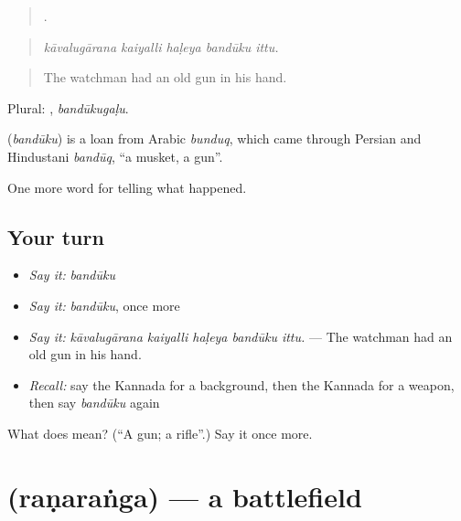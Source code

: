 \begin{quote}
    .
\end{quote}

\begin{quote}
\emph{kāvalugārana kaiyalli haḷeya bandūku ittu.}
\end{quote}

\begin{quote}
The watchman had an old gun in his hand.
\end{quote}

Plural: , \emph{bandūkugaḷu}.

\begin{cousinweb}
\textbf{} (\emph{bandūku}) is a loan from Arabic \emph{bunduq}, which came through Persian and Hindustani \emph{bandūq}, \textquotedblleft{}a musket, a gun\textquotedblright{}.
\end{cousinweb}

\begin{grammarlens}[title={What you've built}]
One more word for telling what happened.
\end{grammarlens}

\subsection*{Your turn}
\begin{itemize}
\raggedright
  \item \emph{Say it:} \emph{bandūku}
  \item \emph{Say it:} \emph{bandūku}, once more
  \item \emph{Say it:} \emph{kāvalugārana kaiyalli haḷeya bandūku ittu.} — The watchman had an old gun in his hand.
  \item \emph{Recall:} say the Kannada for a background, then the Kannada for a weapon, then say \emph{bandūku} again
\end{itemize}

\begin{tcolorbox}[breakable,colback=teal!4,colframe=teal!35!black,title={Before you move on}]
What does  mean? (\textquotedblleft{}A gun; a rifle\textquotedblright{}.) Say it once more.
\end{tcolorbox}
\section[\texorpdfstring{\kn{ರಣರಂಗ} (raṇaraṅga)}{ರಣರಂಗ (raṇaraṅga)}]{ (raṇaraṅga) — a battlefield}


